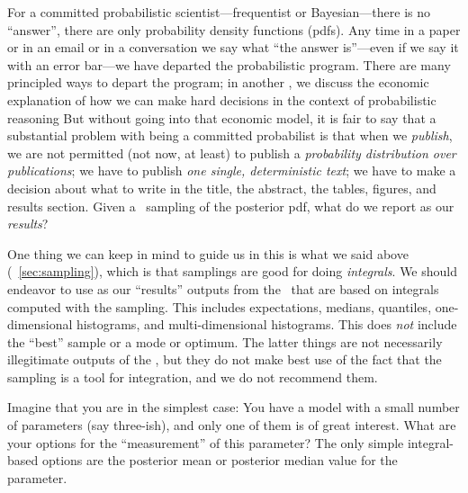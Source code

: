\documentclass[12pt,twoside,pdftex]{article}
\newcommand{\MCMC}{\acronym{MCMC}}
\begin{document}
For a committed probabilistic scientist---frequentist or
Bayesian---there is no ``answer'', there are only probability density
functions (pdfs).  Any time in a paper or in an email or in a conversation
we say what ``the answer is''---even if we say it with an error
bar---we have departed the probabilistic program.  There are many
principled ways to depart the program; in another \documentname, we
discuss the economic explanation of how we can make hard decisions in
the context of probabilistic reasoning
But without going into that economic model, it is fair to say that a
substantial problem with being a committed probabilist is that when we
\emph{publish}, we are not permitted (not now, at least) to publish a
\emph{probability distribution over publications}; we have to publish
\emph{one single, deterministic text}; we have to make a decision about what
to write in the title, the abstract, the tables, figures, and results
section.  Given a \MCMC\ sampling of the posterior pdf, what do we
report as our \emph{results}?

One thing we can keep in mind to guide us in this is what we said above (\sectionname~\ref{sec:sampling}),
  which is that samplings are good for doing \emph{integrals}.
We should endeavor to use as our ``results'' outputs from the \MCMC\
  that are based on integrals computed with the sampling.
This includes expectations, medians, quantiles, one-dimensional histograms,
  and multi-dimensional histograms.
This does \emph{not} include the ``best'' sample or a mode or optimum.
The latter things are not necessarily illegitimate outputs of the \MCMC,
  but they do not make best use of the fact that the sampling is a tool for integration,
  and we do not recommend them.

Imagine that you are in the simplest case:
You have a model with a small number of parameters (say three-ish),
  and only one of them is of great interest.
What are your options for the ``measurement'' of this parameter?
The only simple integral-based options are the posterior mean
  or posterior median value for the parameter.
\end{document}
